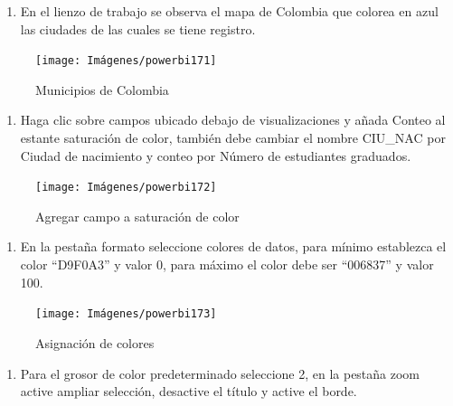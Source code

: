 \documentclass[
]{book}
\providecommand{\tightlist}{%
  \setlength{\itemsep}{0pt}\setlength{\parskip}{0pt}}
\begin{document}
\begin{enumerate}
\def\labelenumi{\arabic{enumi}.}
\setcounter{enumi}{6}
\tightlist
\item
  En el lienzo de trabajo se observa el mapa de Colombia que colorea en azul las ciudades de las cuales se tiene registro.
\end{enumerate}

\begin{figure}

{\centering \texttt{[image: Imágenes/powerbi171]} 

}

\caption{Municipios de Colombia}\label{fig:paso7mapadeformas-fig}
\end{figure}

\begin{enumerate}
\def\labelenumi{\arabic{enumi}.}
\setcounter{enumi}{7}
\tightlist
\item
  Haga clic sobre campos ubicado debajo de visualizaciones y añada Conteo al estante saturación de color, también debe cambiar el nombre CIU\_NAC por Ciudad de nacimiento y conteo por Número de estudiantes graduados.
\end{enumerate}

\begin{figure}

{\centering \texttt{[image: Imágenes/powerbi172]} 

}

\caption{Agregar campo a saturación de color}\label{fig:paso8mapadeformas-fig}
\end{figure}

\begin{enumerate}
\def\labelenumi{\arabic{enumi}.}
\setcounter{enumi}{8}
\tightlist
\item
  En la pestaña formato seleccione colores de datos, para mínimo establezca el color ``D9F0A3'' y valor 0, para máximo el color debe ser ``006837'' y valor 100.
\end{enumerate}

\begin{figure}

{\centering \texttt{[image: Imágenes/powerbi173]} 

}

\caption{Asignación de colores}\label{fig:paso9mapadeformas-fig}
\end{figure}

\begin{enumerate}
\def\labelenumi{\arabic{enumi}.}
\setcounter{enumi}{9}
\tightlist
\item
  Para el grosor de color predeterminado seleccione 2, en la pestaña zoom active ampliar selección, desactive el título y active el borde.
\end{enumerate}
\end{document}
